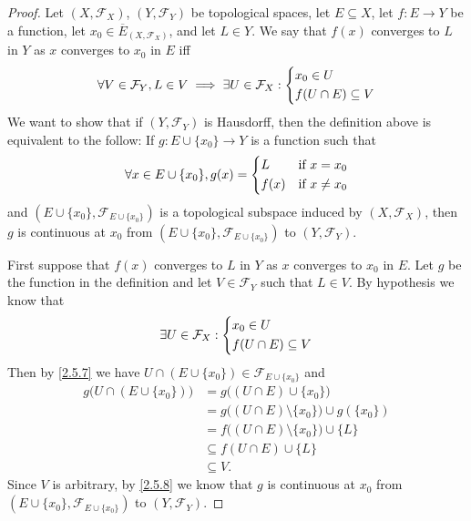 \begin{proof}
  Let \((X, \mathcal{F}_X)\), \((Y, \mathcal{F}_Y)\) be topological spaces, let \(E \subseteq X\), let \(f : E \to Y\) be a function, let \(x_0 \in \overline{E}_{(X, \mathcal{F}_X)}\), and let \(L \in Y\).
  We say that \(f(x)\) converges to \(L\) in \(Y\) as \(x\) converges to \(x_0\) in \(E\) iff
  \[
    \forall V \in \mathcal{F}_Y, L \in V \implies \exists U \in \mathcal{F}_X : \begin{dcases}
      x_0 \in U \\
      f(U \cap E) \subseteq V
    \end{dcases}
  \]
  We want to show that if \((Y, \mathcal{F}_Y)\) is Hausdorff, then the definition above is equivalent to the follow:
  If \(g : E \cup \{x_0\} \to Y\) is a function such that
  \[
    \forall x \in E \cup \{x_0\}, g(x) = \begin{dcases}
      L    & \text{if } x = x_0    \\
      f(x) & \text{if } x \neq x_0
    \end{dcases}
  \]
  and \((E \cup \{x_0\}, \mathcal{F}_{E \cup \{x_0\}})\) is a topological subspace induced by \((X, \mathcal{F}_X)\), then \(g\) is continuous at \(x_0\) from \((E \cup \{x_0\}, \mathcal{F}_{E \cup \{x_0\}})\) to \((Y, \mathcal{F}_Y)\).

  First suppose that \(f(x)\) converges to \(L\) in \(Y\) as \(x\) converges to \(x_0\) in \(E\).
  Let \(g\) be the function in the definition and let \(V \in \mathcal{F}_Y\) such that \(L \in V\).
  By hypothesis we know that
  \[
    \exists U \in \mathcal{F}_X : \begin{dcases}
      x_0 \in U \\
      f(U \cap E) \subseteq V
    \end{dcases}
  \]
  Then by \cref{2.5.7} we have \(U \cap (E \cup \{x_0\}) \in \mathcal{F}_{E \cup \{x_0\}}\) and
  \begin{align*}
    g\big(U \cap (E \cup \{x_0\})\big) & = g\big((U \cap E) \cup \{x_0\}\big)                      \\
                                       & = g\big((U \cap E) \setminus \{x_0\}\big) \cup g(\{x_0\}) \\
                                       & = f\big((U \cap E) \setminus \{x_0\}\big) \cup \{L\}      \\
                                       & \subseteq f(U \cap E) \cup \{L\}                          \\
                                       & \subseteq V.
  \end{align*}
  Since \(V\) is arbitrary, by \cref{2.5.8} we know that \(g\) is continuous at \(x_0\) from \((E \cup \{x_0\}, \mathcal{F}_{E \cup \{x_0\}})\) to \((Y, \mathcal{F}_Y)\).


\end{proof}
